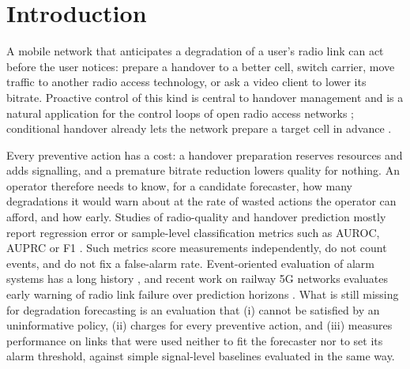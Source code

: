 \documentclass[preprint,review,12pt]{elsarticle}
\begin{document}
\section{Introduction}
\label{sec:intro}

A mobile network that anticipates a degradation of a user's radio link can act
before the user notices: prepare a handover to a better cell, switch carrier,
move traffic to another radio access technology, or ask a video client to lower
its bitrate. Proactive control of this kind is central to handover management
\cite{tayyab2019,mollel2021survey,alraih2023} and is a natural application for the
control loops of open radio access networks \cite{polese2023}; conditional
handover already lets the network prepare a target cell in advance
\cite{pjanic2024}.

Every preventive action has a cost: a handover preparation reserves resources and
adds signalling, and a premature bitrate reduction lowers quality for nothing. An
operator therefore needs to know, for a candidate forecaster, how many
degradations it would warn about at the rate of wasted actions the operator can
afford, and how early. Studies of radio-quality and handover prediction mostly
report regression error or sample-level classification metrics such as AUROC,
AUPRC or F1 \cite{mollel2021,fauzi2022,mohammadjafari2020,lima2023,manalastas2023}.
Such metrics score measurements independently, do not count events, and do not
fix a false-alarm rate. Event-oriented evaluation of alarm systems has a long
history \cite{fawcett1999,lavin2015,tatbul2018}, and recent work on railway 5G
networks evaluates early warning of radio link failure over prediction horizons
\cite{chou2025}. What is still missing for degradation forecasting is an
evaluation that (i) cannot be satisfied by an uninformative policy, (ii) charges
for every preventive action, and (iii) measures performance on links that were
used neither to fit the forecaster nor to set its alarm threshold, against simple
signal-level baselines evaluated in the same way.
\end{document}
